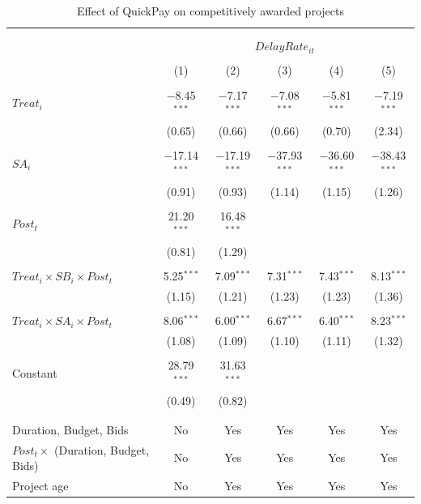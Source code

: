 \documentclass[
]{article}
\begin{document}
\begin{table}[H] \centering 
  \caption{Effect of QuickPay on competitively awarded projects} 
  \label{} 
\small 
\begin{tabular}{@{\extracolsep{-2pt}}lccccc} 
\\[-1.8ex]\hline 
\hline \\[-1.8ex] 
\\[-1.8ex] & \multicolumn{5}{c}{$DelayRate_{it}$  } \\ 
\\[-1.8ex] & (1) & (2) & (3) & (4) & (5)\\ 
\hline \\[-1.8ex] 
 $Treat_i$ & $-$8.45$^{***}$ & $-$7.17$^{***}$ & $-$7.08$^{***}$ & $-$5.81$^{***}$ & $-$7.19$^{***}$ \\ 
  & (0.65) & (0.66) & (0.66) & (0.70) & (2.34) \\ 
  & & & & & \\ 
 $SA_i$ & $-$17.14$^{***}$ & $-$17.19$^{***}$ & $-$37.93$^{***}$ & $-$36.60$^{***}$ & $-$38.43$^{***}$ \\ 
  & (0.91) & (0.93) & (1.14) & (1.15) & (1.26) \\ 
  & & & & & \\ 
 $Post_t$ & 21.20$^{***}$ & 16.48$^{***}$ &  &  &  \\ 
  & (0.81) & (1.29) &  &  &  \\ 
  & & & & & \\ 
 $Treat_i \times SB_i \times Post_t$ & 5.25$^{***}$ & 7.09$^{***}$ & 7.31$^{***}$ & 7.43$^{***}$ & 8.13$^{***}$ \\ 
  & (1.15) & (1.21) & (1.23) & (1.23) & (1.36) \\ 
  & & & & & \\ 
 $Treat_i \times SA_i \times Post_t$ & 8.06$^{***}$ & 6.00$^{***}$ & 6.67$^{***}$ & 6.40$^{***}$ & 8.23$^{***}$ \\ 
  & (1.08) & (1.09) & (1.10) & (1.11) & (1.32) \\ 
  & & & & & \\ 
 Constant & 28.79$^{***}$ & 31.63$^{***}$ &  &  &  \\ 
  & (0.49) & (0.82) &  &  &  \\ 
  & & & & & \\ 
\hline \\[-1.8ex] 
Duration, Budget, Bids & No & Yes & Yes & Yes & Yes \\ 
$Post_t \times $  (Duration, Budget, Bids) & No & Yes & Yes & Yes & Yes \\ 
Project age & No & Yes & Yes & Yes & Yes \\ 

\end{tabular}
\end{table}
\end{document}

